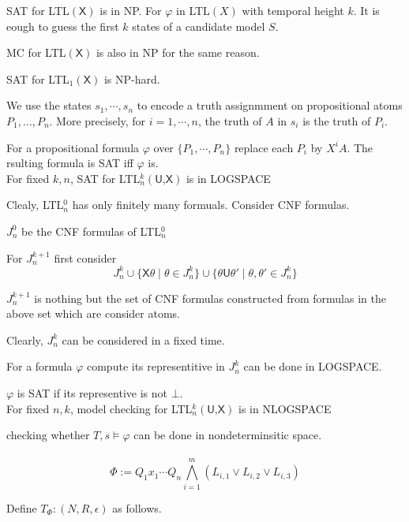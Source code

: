 \documentclass[12pt]{article}
\begin{document}
\begin{CJK*}{GBK}{song}

SAT for LTL$(\textsf{X})$ is in NP. For $\varphi$ in LTL$(X)$ with temporal height $k$.  It is eough to guess the first $k$ states of a candidate model $S$.

MC for LTL$(\textsf{X})$ is also in NP for the same reason.


SAT for LTL$_1(\textsf{X})$ is NP-hard.

We use the states $s_1,\cdots, s_n$ to encode a truth assignmment on propositional atoms $P_1,\dots, P_n$. More precisely, for $i=1,\cdots, n$, the truth of $A$ in $s_i$ is the truth of $P_i$.

For a propositional formula $\varphi$ over $\{P_1,\cdots, P_n\}$ replace each $P_i$ by $X^iA$. The rsulting formula is SAT iff $\varphi$ is.\\




For fixed $k,n$, SAT for LTL$_n^k(\textsf{U,X})$ is in LOGSPACE

Clealy, LTL$^0_n$ has only finitely many formuals. Consider CNF formulas.

$J_n^0$ be the CNF formulas of LTL$^0_n$

For $J_n^{k+1}$ first consider
%
$$J_n^k\cup\{\textsf{X}\theta\mid \theta\in J_n^k\}\cup\{\theta\textsf{U}\theta'\mid \theta,\theta'\in J^k_n\}$$

$J_n^{k+1}$ is nothing but the set of CNF formulas constructed from formulas in the above set which are consider atoms.


Clearly, $J_n^k$ can be considered in a fixed time.

For a formula $\varphi$ compute its representitive in $J^k_n$ can be done in LOGSPACE.


$\varphi$ is SAT if its representive is not $\bot$.
\\


For fixed $n,k$, model checking for LTL$_n^k(\textsf{U,X})$ is in NLOGSPACE


checking whether $T,s\models \varphi$ can be done in nondeterminsitic space.
\\ \ \\





$$\Phi:=Q_1x_1\cdots Q_n\bigwedge_{i=1}^m \left(L_{i,1}\vee L_{i,2}\vee L_{i,3}\right)$$

Define $T_{\Phi}:(N,R,\epsilon)$ as follows.



\end{CJK*}
\end{document}
